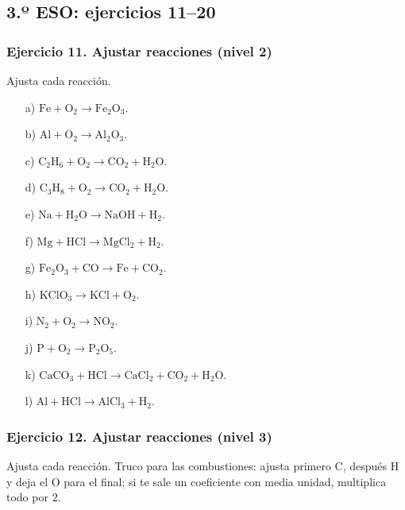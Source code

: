 \subsection{3.º ESO: ejercicios 11--20}

\subsubsection*{Ejercicio 11. Ajustar reacciones (nivel 2)}

Ajusta cada reacción.

\begin{enumerate}
    \item[a)] $\mathrm{Fe}+\mathrm{O_2}\rightarrow\mathrm{Fe_2O_3}$.
    \item[b)] $\mathrm{Al}+\mathrm{O_2}\rightarrow\mathrm{Al_2O_3}$.
    \item[c)] $\mathrm{C_2H_6}+\mathrm{O_2}\rightarrow\mathrm{CO_2}+\mathrm{H_2O}$.
    \item[d)] $\mathrm{C_3H_8}+\mathrm{O_2}\rightarrow\mathrm{CO_2}+\mathrm{H_2O}$.
    \item[e)] $\mathrm{Na}+\mathrm{H_2O}\rightarrow\mathrm{NaOH}+\mathrm{H_2}$.
    \item[f)] $\mathrm{Mg}+\mathrm{HCl}\rightarrow\mathrm{MgCl_2}+\mathrm{H_2}$.
    \item[g)] $\mathrm{Fe_2O_3}+\mathrm{CO}\rightarrow\mathrm{Fe}+\mathrm{CO_2}$.
    \item[h)] $\mathrm{KClO_3}\rightarrow\mathrm{KCl}+\mathrm{O_2}$.
    \item[i)] $\mathrm{N_2}+\mathrm{O_2}\rightarrow\mathrm{NO_2}$.
    \item[j)] $\mathrm{P}+\mathrm{O_2}\rightarrow\mathrm{P_2O_5}$.
    \item[k)] $\mathrm{CaCO_3}+\mathrm{HCl}\rightarrow
    \mathrm{CaCl_2}+\mathrm{CO_2}+\mathrm{H_2O}$.
    \item[l)] $\mathrm{Al}+\mathrm{HCl}\rightarrow\mathrm{AlCl_3}+\mathrm{H_2}$.
\end{enumerate}

\subsubsection*{Ejercicio 12. Ajustar reacciones (nivel 3)}

Ajusta cada reacción. Truco para las combustiones:
ajusta primero C, después H y deja el O para el final;
si te sale un coeficiente con media unidad, multiplica todo por $2$.


